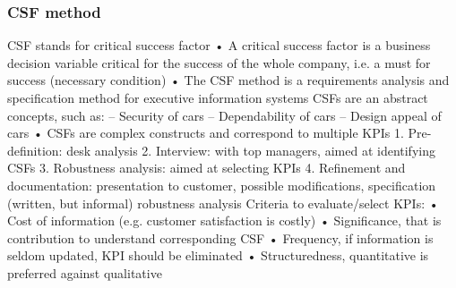 \subsubsection{CSF method}
CSF stands for critical success factor
• A critical success factor is a business decision variable critical
for the success of the whole company, i.e. a must for success
(necessary condition)
• The CSF method is a requirements analysis and specification
method for executive information systems
CSFs are an abstract concepts, such as:
– Security of cars
– Dependability of cars
– Design appeal of cars
• CSFs are complex constructs and correspond to multiple KPIs
1. Pre-definition: desk analysis
2. Interview: with top managers, aimed at identifying CSFs
3. Robustness analysis: aimed at selecting KPIs
4. Refinement and documentation: presentation to customer,
possible modifications, specification (written, but informal)
robustness analysis
Criteria to evaluate/select KPIs:
• Cost of information (e.g. customer satisfaction is costly)
• Significance, that is contribution to understand corresponding CSF
• Frequency, if information is seldom updated, KPI should be eliminated
• Structuredness, quantitative is preferred against qualitative